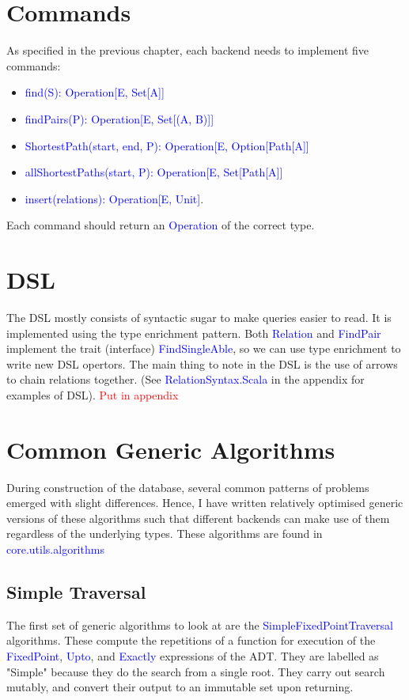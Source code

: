 \documentclass[12pt,a4paper,twoside,openright]{report}
\newcommand\todo[1]{\textcolor{red}{#1}}
\newcommand\codeName[1]{\textcolor{blue}{#1}}
\begin{document}
{{\section{Commands}
As specified in the previous chapter, each backend needs to implement five commands: 
\begin{itemize}
\item \codeName{find(S): Operation[E, Set[A]]}
\item \codeName{findPairs(P): Operation[E, Set[(A, B)]]}
\item \codeName{ShortestPath(start, end, P): Operation[E, Option[Path[A]]}
\item \codeName{allShortestPaths(start, P): Operation[E, Set[Path[A]]}
\item \codeName{insert(relations): Operation[E, Unit]}.
\end{itemize}
Each command should return an \codeName{Operation} of the correct type.
\section{DSL}
The DSL mostly consists of syntactic sugar to make queries easier to read. It is implemented using the type enrichment pattern. Both \codeName{Relation} and \codeName{FindPair} implement the trait (interface) \codeName{FindSingleAble}, so we can use type enrichment to write new DSL opertors. The main thing to note in the DSL is the use of arrows to chain relations together. (See \codeName{RelationSyntax.Scala} in the appendix for examples of DSL). \todo{Put in appendix}

\section{Common Generic Algorithms}
During construction of the database, several common patterns of problems emerged with slight differences. Hence, I have written relatively optimised generic versions of these algorithms such that different backends can make use of them regardless of the underlying types. These algorithms are found in \codeName{core.utils.algorithms}


	\subsection{Simple Traversal}
	The first set of generic algorithms to look at are the \codeName{SimpleFixedPointTraversal} algorithms. These compute the repetitions of a function for execution of the \codeName{FixedPoint}, \codeName{Upto}, and \codeName{Exactly} expressions of the ADT. They are labelled as "Simple" because they do the search from a single root. They carry out search mutably, and convert their output to an immutable set upon returning.
	
}}
\end{document}
